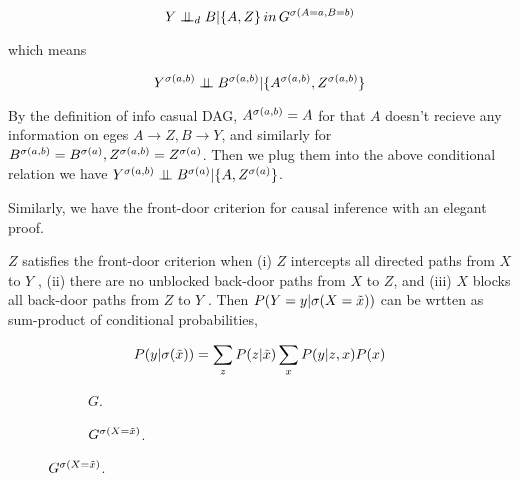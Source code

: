 $$
Y \perp\mkern-9.5mu\perp_d B | \{A, Z\} \, in \, G^{\mathrm{\sigma}(A=a, B=b)}
$$

which means

$$
Y^{\mathrm{\sigma}(a, b)} \perp\mkern-9.5mu\perp B^{\mathrm{\sigma}(a, b)} | \{A^{\mathrm{\sigma}(a, b)}, Z^{\mathrm{\sigma}(a, b)}\} 
$$

By the definition of info casual DAG, $A^{\mathrm{\sigma}(a, b)}= A$ for that $A$ doesn't recieve any information on eges $A \rightarrow Z, B \rightarrow Y$, and similarly for $B^{\mathrm{\sigma}(a, b)} = B^{\mathrm{\sigma}(a)}, Z^{\mathrm{\sigma}(a, b)} = Z^{\mathrm{\sigma}(a)}$. Then we plug them into the above conditional relation we have $Y^{\mathrm{\sigma}(a, b)} \perp\mkern-9.5mu\perp B^{\mathrm{\sigma}(a)} | \{A, Z^{\mathrm{\sigma}(a)}\}$.


Similarly, we have the front-door criterion for causal inference with an elegant proof.

\begin{Thm}
	$Z$ satisfies the front-door criterion when (i) $Z$ intercepts all directed paths from $X$ to $Y$ , (ii) there are no unblocked back-door paths from	$X$ to $Z$, and (iii) $X$ blocks all back-door paths from $Z$ to $Y$ . Then  $P(Y=y|\mathrm{\sigma}(X=\tilde{x}))$ can be wrtten as sum-product of conditional probabilities, 
	
	\begin{equation}
	P(y|\mathrm{\sigma}(\tilde{x})) = \sum_z  P(z|\tilde{x}) \sum_x P(y|z, x) P(x)
	\end{equation}
	
	
	\begin{figure}[h]
		\begin{subfigure}[tb]{0.5\textwidth}
			\centering
			\caption{ $G$.}
			\label{fig:front1}
		\end{subfigure}
		\hfill
		\begin{subfigure}[tb]{0.5\textwidth}
			\centering
			\caption{ $G^{\mathrm{\sigma}(X=\tilde{x})}$.}
			\label{fig:indep2}
		\end{subfigure}
		

\end{figure}
\end{Thm}
